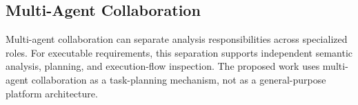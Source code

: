 \subsection{Multi-Agent Collaboration}
\label{sec:rw-multi-agent}

Multi-agent collaboration can separate analysis responsibilities across specialized roles.
For executable requirements, this separation supports independent semantic analysis, planning, and execution-flow inspection.
The proposed work uses multi-agent collaboration as a task-planning mechanism, not as a general-purpose platform architecture.
